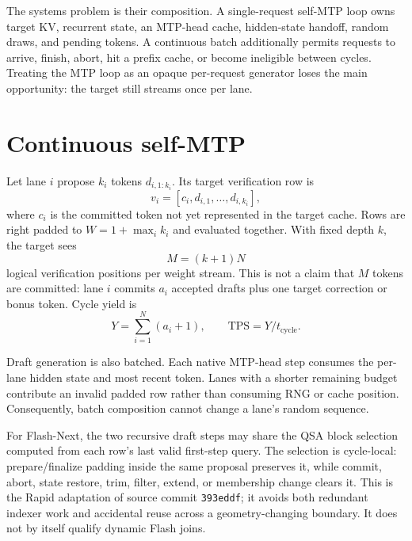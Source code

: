 \documentclass[10pt,twocolumn]{article}
\begin{document}
The systems problem is their composition.  A single-request self-MTP loop owns
target KV, recurrent state, an MTP-head cache, hidden-state handoff, random
draws, and pending tokens.  A continuous batch additionally permits requests
to arrive, finish, abort, hit a prefix cache, or become ineligible between
cycles.  Treating the MTP loop as an opaque per-request generator loses the
main opportunity: the target still streams once per lane.

\section{Continuous self-MTP}
Let lane $i$ propose $k_i$ tokens $d_{i,1:k_i}$.  Its target verification row
is
\begin{equation}
  v_i=[c_i,d_{i,1},\ldots,d_{i,k_i}],
\end{equation}
where $c_i$ is the committed token not yet represented in the target cache.
Rows are right padded to $W=1+\max_i k_i$ and evaluated together.  With fixed
depth $k$, the target sees
\begin{equation}
  M=(k+1)N
\end{equation}
logical verification positions per weight stream.  This is not a claim that
$M$ tokens are committed: lane $i$ commits $a_i$ accepted drafts plus one
target correction or bonus token.  Cycle yield is
\begin{equation}
  Y=\sum_{i=1}^{N}(a_i+1), \qquad
  \mathrm{TPS}=Y/t_{\mathrm{cycle}}.
\end{equation}

Draft generation is also batched.  Each native MTP-head step consumes the
per-lane hidden state and most recent token.  Lanes with a shorter remaining
budget contribute an invalid padded row rather than consuming RNG or cache
position.  Consequently, batch composition cannot change a lane's random
sequence.

For Flash-Next, the two recursive draft steps may share the QSA block
selection computed from each row's last valid first-step query.  The selection
is cycle-local: prepare/finalize padding inside the same proposal preserves it,
while commit, abort, state restore, trim, filter, extend, or membership change
clears it.  This is the Rapid adaptation of source commit
\texttt{393eddf}; it avoids both redundant indexer work and accidental reuse
across a geometry-changing boundary.  It does not by itself qualify dynamic
Flash joins.
\end{document}
